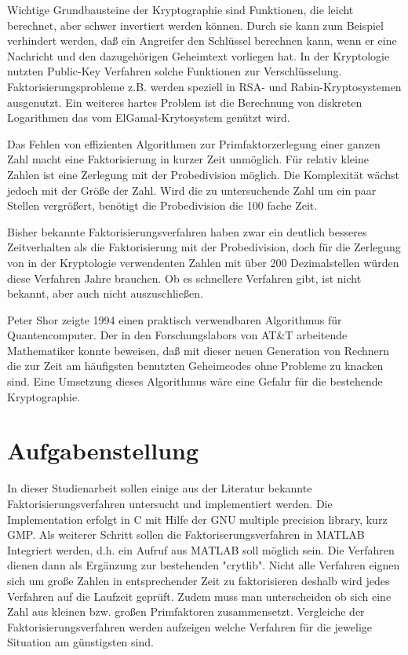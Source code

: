 \documentclass[a4paper,11pt]{article}
\begin{document}
Wichtige Grundbausteine der Kryptographie sind Funktionen, die
leicht berechnet, aber schwer invertiert werden können. Durch sie
kann zum Beispiel verhindert werden, daß ein Angreifer den Schlüssel
berechnen kann, wenn er eine Nachricht und den dazugehörigen Geheimtext
vorliegen hat. In der Kryptologie nutzten Public-Key Verfahren solche
Funktionen zur Verschlüsselung. Faktorisierungsprobleme z.B. werden
speziell in RSA- und Rabin-Kryptosystemen ausgenutzt. Ein weiteres
hartes Problem ist die Berechnung von diskreten Logarithmen
das vom ElGamal-Krytosystem genützt wird.

Das Fehlen von effizienten Algorithmen zur Primfaktorzerlegung einer
ganzen Zahl macht eine Faktorisierung in kurzer Zeit unmöglich.
Für relativ kleine Zahlen ist eine Zerlegung mit der Probedivision
möglich. Die Komplexität wächst jedoch mit der Größe der Zahl. Wird
die zu untersuchende Zahl um ein paar Stellen vergrößert, benötigt
die Probedivision die 100 fache Zeit.

Bisher bekannte Faktorisierungsverfahren
haben zwar ein deutlich besseres Zeitverhalten als die Faktorisierung
mit der Probedivision, doch für die Zerlegung von in
der Kryptologie verwendenten Zahlen mit über 200 Dezimalstellen würden
diese Verfahren Jahre brauchen. Ob es schnellere Verfahren gibt,
ist nicht bekannt, aber auch nicht auszuschließen.

Peter Shor zeigte 1994 einen praktisch verwendbaren Algorithmus für
Quantencomputer. Der in den Forschungslabors von AT\&T arbeitende
Mathematiker konnte beweisen, daß mit dieser neuen Generation von
Rechnern die zur Zeit am häufigsten benutzten Geheimcodes ohne Probleme
zu knacken sind. Eine Umsetzung dieses Algorithmus wäre eine Gefahr für
die bestehende Kryptographie.

\section{Aufgabenstellung}
In dieser Studienarbeit sollen einige aus der Literatur bekannte
Faktorisierungsverfahren untersucht und implementiert werden. Die
Implementation erfolgt in C mit Hilfe der GNU multiple precision
library, kurz GMP. Als weiterer Schritt sollen die
Faktoriserungsverfahren in MATLAB Integriert werden, d.h. ein Aufruf
aus MATLAB soll möglich sein. Die Verfahren dienen dann als Ergänzung
zur bestehenden "crytlib".
Nicht alle Verfahren eignen sich um große Zahlen in entsprechender Zeit
zu faktorisieren deshalb wird jedes Verfahren auf die Laufzeit geprüft.
Zudem muss man unterscheiden ob sich eine Zahl aus kleinen bzw. großen
Primfaktoren zusammensetzt. Vergleiche der Faktorisierungsverfahren
werden aufzeigen welche Verfahren für die jewelige Situation am
günstigsten sind.
\end{document}
